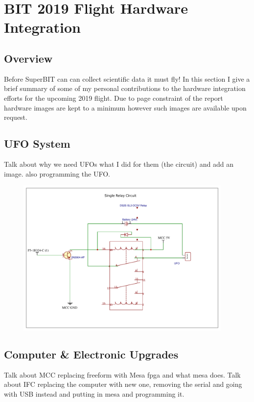 \chapter{BIT 2019 Flight Hardware Integration}
\section{Overview}
Before SuperBIT can can collect scientific data it must fly! In this section I give a brief summary of some of my personal contributions to the hardware integration efforts for the upcoming 2019 flight. Due to page constraint of the report hardware images are kept to a minimum however such images are available upon request. 

\section{UFO System}
Talk about why we need UFOs what I did for them (the circuit) and add an image. also programming the UFO.

\begin{figure}
    \begin{small}
        \begin{center}
            \includegraphics[width=0.95\textwidth]{Hardware/figs/UFO_circ.pdf}
        \end{center}
        \caption{}
        \label{fig:}
    \end{small}
\end{figure}


\section{Computer \& Electronic Upgrades}
Talk about MCC replacing freeform with Mesa fpga and what mesa does. 
Talk about IFC replacing the computer with new one, removing the serial and going with USB instead and putting in mesa and programming it.

